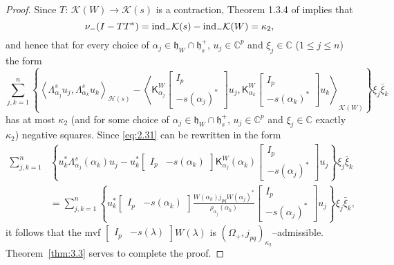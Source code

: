 \documentclass[12pt,twoside,a4paper]{amsart}
\theoremstyle{definition}
\numberwithin{equation}{section}
\begin{document}
\begin{proof}
Since $T:\, {{\mathcal K}}(W)\to{{\mathcal K}}(s)$ is a contraction,  Theorem 1.3.4 of
\cite{ADRS} implies that
\[
\nu_-(I-TT^*)=\textup{ind}_-{{\mathcal K}}(s)-\textup{ind}_-{{\mathcal K}}(W)=\kappa_2,
\]
and hence that for every choice of
$\alpha_j\in{{\mathfrak h}}_W\cap{{\mathfrak h}}_s^+,\,u_j\in{{\mathbb C}}^p$ and $\xi_j\in{{\mathbb C}}$ ($1\le
j\le n$) the form
\begin{equation}\label{eq:2.31}
  \sum_{j,k=1}^n\left\{
\left\langle{\mathsf \Lambda}_{\alpha_j}^su_j,{\mathsf
\Lambda}_{\alpha_k}^su_k\right\rangle_{{{\mathcal H}}(s)} -\left\langle{\mathsf
K}_{\alpha_j}^W\begin{bmatrix}
  I_p \\
  -s(\alpha_j)^*
\end{bmatrix} u_j,{\mathsf K}_{\alpha_k}^W\begin{bmatrix}
  I_p \\
  -s(\alpha_k)^*
\end{bmatrix} u_k\right\rangle_{{{\mathcal K}}(W)}\right\}\xi_j\bar\xi_k
\end{equation}
has at most $\kappa_2$ (and for some choice of
$\alpha_j\in{{\mathfrak h}}_W\cap{{\mathfrak h}}_s^+,\,u_j\in{{\mathbb C}}^p$ and $\xi_j\in{{\mathbb C}}$
exactly $\kappa_2$) negative squares. Since \eqref{eq:2.31} can be
rewritten in the form
\[
 \begin{split}
 \sum_{j,k=1}^n&\left\{
u_k^*{\mathsf \Lambda}_{\alpha_j}^s(\alpha_k)u_j
-u_k^*\begin{bmatrix} I_p & -s(\alpha_k)
\end{bmatrix}{\mathsf K}_{\alpha_j}^W(\alpha_k)\begin{bmatrix}
  I_p \\
  -s(\alpha_j)^*
\end{bmatrix} u_j\right\}\xi_j\bar\xi_k\\
&=\sum_{j,k=1}^n\left\{ u_k^*\begin{bmatrix} I_p & -s(\alpha_k)
\end{bmatrix}
\frac{W(\alpha_k)j_{pq}W(\alpha_j)^*}{\rho_{\alpha_j}(\alpha_k)}\begin{bmatrix}
  I_p \\
  -s(\alpha_j)^*
\end{bmatrix} u_j\right\}\xi_j\bar\xi_k,
\end{split}
\]
it follows that the mvf $ \begin{bmatrix} I_p & -s(\lambda)
\end{bmatrix}W (\lambda)$ is
$(\Omega_+,j_{pq})_{\kappa_2}$--admissible. Theorem~\ref{thm:3.3}
serves to complete the proof.
\end{proof}
\end{document}
